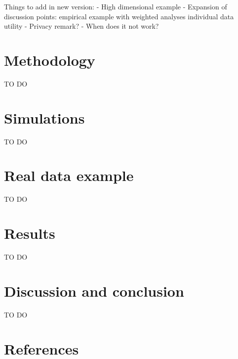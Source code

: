 \documentclass[
]{article}
\begin{document}
Things to add in new version: - High dimensional example - Expansion of
discussion points: empirical example with weighted analyses individual
data utility - Privacy remark? - When does it not work?

\hypertarget{methodology-1}{%
\section{Methodology}\label{methodology-1}}

TO DO

\hypertarget{simulations-1}{%
\section{Simulations}\label{simulations-1}}

TO DO

\hypertarget{real-data-example-1}{%
\section{Real data example}\label{real-data-example-1}}

TO DO

\hypertarget{results}{%
\section{Results}\label{results}}

TO DO

\hypertarget{discussion-and-conclusion}{%
\section{Discussion and conclusion}\label{discussion-and-conclusion}}

TO DO

\hypertarget{references}{%
\section*{References}\label{references}}
\end{document}
